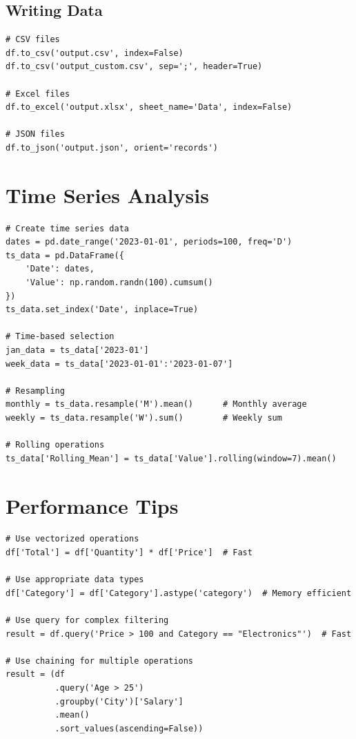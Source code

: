 \documentclass[12pt,a4paper]{article}
\begin{document}
\subsection{Writing Data}

\begin{lstlisting}
# CSV files
df.to_csv('output.csv', index=False)
df.to_csv('output_custom.csv', sep=';', header=True)

# Excel files
df.to_excel('output.xlsx', sheet_name='Data', index=False)

# JSON files
df.to_json('output.json', orient='records')
\end{lstlisting}

\section{Time Series Analysis}

\begin{lstlisting}
# Create time series data
dates = pd.date_range('2023-01-01', periods=100, freq='D')
ts_data = pd.DataFrame({
    'Date': dates,
    'Value': np.random.randn(100).cumsum()
})
ts_data.set_index('Date', inplace=True)

# Time-based selection
jan_data = ts_data['2023-01']
week_data = ts_data['2023-01-01':'2023-01-07']

# Resampling
monthly = ts_data.resample('M').mean()      # Monthly average
weekly = ts_data.resample('W').sum()        # Weekly sum

# Rolling operations
ts_data['Rolling_Mean'] = ts_data['Value'].rolling(window=7).mean()
\end{lstlisting}

\section{Performance Tips}

\begin{lstlisting}
# Use vectorized operations
df['Total'] = df['Quantity'] * df['Price']  # Fast

# Use appropriate data types
df['Category'] = df['Category'].astype('category')  # Memory efficient

# Use query for complex filtering
result = df.query('Price > 100 and Category == "Electronics"')  # Fast

# Use chaining for multiple operations
result = (df
          .query('Age > 25')
          .groupby('City')['Salary']
          .mean()
          .sort_values(ascending=False))
\end{lstlisting}
\end{document}
